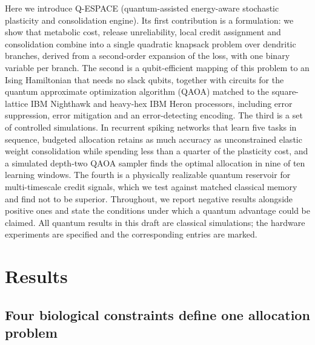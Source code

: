 Here we introduce Q-ESPACE (quantum-assisted energy-aware stochastic plasticity and consolidation engine). Its first contribution is a formulation: we show that metabolic cost, release unreliability, local credit assignment and consolidation combine into a single quadratic knapsack problem over dendritic branches, derived from a second-order expansion of the loss, with one binary variable per branch. The second is a qubit-efficient mapping of this problem to an Ising Hamiltonian that needs no slack qubits, together with circuits for the quantum approximate optimization algorithm (QAOA)\cite{farhi2014,blekos2024} matched to the square-lattice IBM Nighthawk and heavy-hex IBM Heron processors\cite{ibm2026}, including error suppression, error mitigation and an error-detecting encoding. The third is a set of controlled simulations. In recurrent spiking networks that learn five tasks in sequence, budgeted allocation retains as much accuracy as unconstrained elastic weight consolidation while spending less than a quarter of the plasticity cost, and a simulated depth-two QAOA sampler finds the optimal allocation in nine of ten learning windows. The fourth is a physically realizable quantum reservoir for multi-timescale credit signals, which we test against matched classical memory and find not to be superior. Throughout, we report negative results alongside positive ones and state the conditions under which a quantum advantage could be claimed. All quantum results in this draft are classical simulations; the hardware experiments are specified and the corresponding entries are marked.

\section*{Results}

\subsection*{Four biological constraints define one allocation problem}

